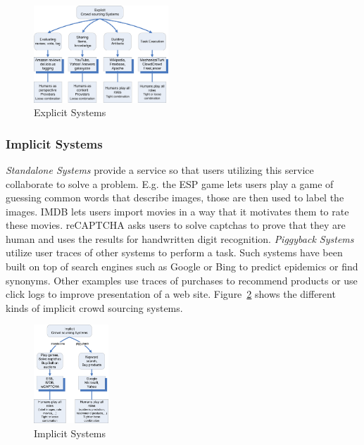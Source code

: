 \documentclass{sig-alternate}
\begin{document}
\newline
\begin{figure}[h]
	\centering
	\includegraphics[width=0.45\textwidth]{explicit}
	\caption{Explicit Systems}
      \label{fig:explicit}
\end{figure}
\subsubsection{Implicit Systems}
\textit{Standalone Systems} provide a service so that users utilizing this service collaborate to solve a problem. E.g. the ESP game \cite{conf/aaaiss/AhnD05} lets users play a game of guessing common words that describe images, those are then used to label the images. IMDB \cite{conf/apweb/HuWWGZ10} lets users import movies in a way that it motivates them to rate these movies. reCAPTCHA \cite{von2008recaptcha} asks users to solve captchas to prove that they are human and uses the results for handwritten digit recognition.
\newline\newline
\textit{Piggyback Systems} utilize user traces of other systems to perform a task. Such systems have been built on top of search engines such as Google or Bing to predict epidemics or find synonyms. Other examples use traces of purchases to recommend products or use click logs to improve presentation of a web site. Figure~\ref{fig:implicit} shows the different kinds of implicit crowd sourcing systems.
\newline
\begin{figure}[h]
	\centering
	\includegraphics[width=0.25\textwidth]{implicit}
	\caption{Implicit Systems}
      \label{fig:implicit}
\end{figure}
\end{document}
